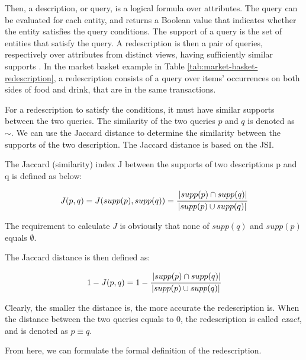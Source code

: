 Then, a description, or query, is a logical formula over attributes.
The query can be evaluated for each entity, and returns a Boolean value that indicates whether the entity satisfies the query conditions.
The support of a query is the set of entities that satisfy the query.
A redescription is then a pair of queries, respectively over attributes from distinct views, having sufficiently similar supports \cite{galbrun2018redescription}.
In the market basket example in Table \ref{tab:market-basket-redescription}, a redescription consists of a query over items' occurrences on both sides of food and drink, that are in the same transactions.

For a redescription to satisfy the conditions, it must have similar supports between the two queries.
The similarity of the two queries $p$ and $q$ is denoted as $\sim$.
We can use the Jaccard distance to determine the similarity between the supports of the two description.
The Jaccard distance is based on the \acl{JSI}.

\begin{definition}
    The Jaccard (similarity) index J between the supports of two descriptions p and q is defined as below:

    \begin{equation}
        J(p, q) = J(supp(p), supp(q)) = \cfrac{\left|supp(p)\cap supp(q)\right|}{\left|supp(p)\cup supp(q)\right|}
    \end{equation}
\end{definition}

The requirement to calculate $J$ is obviously that none of $supp(q)$ and $supp(p)$ equals $\emptyset$.

\begin{definition}
    The Jaccard distance is then defined as:

    \begin{equation}
        1 - J(p, q) = 1 - \cfrac{\left|supp(p)\cap supp(q)\right|}{\left|supp(p)\cup supp(q)\right|}
    \end{equation}
\end{definition}

Clearly, the smaller the distance is, the more accurate the redescription is.
When the distance between the two queries equals to $0$, the redescription is called \textit{exact}, and is denoted as $p \equiv q$.

From here, we can formulate the formal definition of the redescription.

